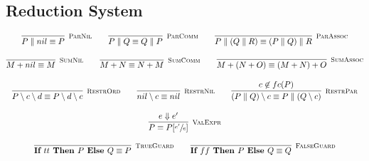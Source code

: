 \subsection{Reduction System}
	\begin{gather*}
    \infer[\mbox{\footnotesize\scshape ParNil}]{P \parallel nil \equiv P}{} \qquad
    \infer[\mbox{\footnotesize\scshape ParComm}]{P \parallel Q \equiv Q \parallel P}{} \qquad
    \infer[\mbox{\footnotesize\scshape ParAssoc}]{P \parallel (Q \parallel R) \equiv (P \parallel Q) \parallel R}{} 
    \\[0.3cm]
    \infer[\mbox{\footnotesize\scshape SumNil}]{M + nil \equiv M}{} \qquad
    \infer[\mbox{\footnotesize\scshape SumComm}]{M + N \equiv N + M}{} \qquad
    \infer[\mbox{\footnotesize\scshape SumAssoc}]{M + (N + O) \equiv (M + N) + O}{} 
    \\[0.3cm]
    \infer[\mbox{\footnotesize\scshape RestrOrd}]{P \setminus c \setminus d \equiv P \setminus d \setminus c}{} \qquad 
    \infer[\mbox{\footnotesize\scshape RestrNil}]{nil \setminus c \equiv nil}{} \qquad 
    \infer[\mbox{\footnotesize\scshape RestrPar}]{(P \parallel Q) \setminus c \equiv P \parallel (Q \setminus c)}{c \not\in fc(P)} \\[0.3cm]
    \infer[\mbox{\footnotesize\scshape ValExpr}]{ P \equiv P[\sfrac{e'}{e}] }{e \Downarrow e'} \\[0.3cm]
    \infer[\mbox{\footnotesize\scshape TrueGuard}]{\ITE{tt}{P}{Q} \equiv P}{} \qquad
    \infer[\mbox{\footnotesize\scshape FalseGuard}]{\ITE{ff}{P}{Q} \equiv Q}{} 
	\end{gather*}	

